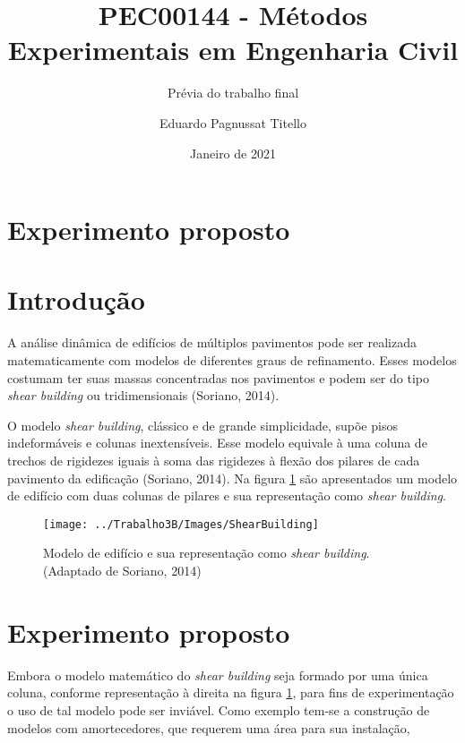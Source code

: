 

\author{Eduardo Pagnussat Titello}
\title{PEC00144 - Métodos Experimentais em Engenharia Civil}
\subtitle{Prévia do trabalho final}
\date{Janeiro de 2021}




\maketitle



\section{Experimento proposto}



\section{Introdução}
A análise dinâmica de edifícios de múltiplos pavimentos pode ser realizada matematicamente com modelos de diferentes graus de refinamento. Esses modelos costumam ter suas massas concentradas nos pavimentos e podem ser do tipo \textit{shear building} ou tridimensionais (Soriano, 2014).

O modelo \textit{shear building}, clássico e de grande simplicidade, supõe pisos indeformáveis e colunas inextensíveis. Esse modelo equivale à uma coluna de trechos de rigidezes iguais à soma das rigidezes à flexão dos pilares de cada pavimento da edificação (Soriano, 2014). Na figura \ref{fig:shearb} são apresentados um modelo de edifício com duas colunas de pilares e sua representação como \textit{shear building}.


\begin{figure}
	\centering
	\caption{Modelo de edifício e sua representação como \textit{shear building}.\\ \small{(Adaptado de Soriano, 2014)}}
	\texttt{[image: ../Trabalho3B/Images/ShearBuilding]}
	\label{fig:shearb}
\end{figure}



\section{Experimento proposto}

Embora o modelo matemático do \textit{shear building} seja formado por uma única coluna, conforme representação à direita na figura \ref{fig:shearb}, para fins de experimentação o uso de tal modelo pode ser inviável. Como exemplo tem-se a construção de modelos com amortecedores, que requerem uma área para sua instalação, 

